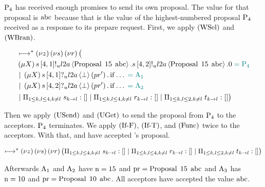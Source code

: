 $\Proposer{4}$ has received enough promises to send its own proposal.
The value for that proposal is $\ABC$ because that is the value of the highest-numbered proposal $\Proposer{4}$ received as a response to its prepare request.
First, we apply $\RWsel$ and $\RWbran$.

\begin{align*}
&\mapstostar \NuChannels \big (\\
&\Mu{\RecursionVariable} \SendUnreliableP{s}{4}{1}{\LTwoA}{\ProposalC{15}{\ABC}}.
\SendUnreliableP{s}{4}{2}{\LTwoA}{\ProposalC{15}{\ABC}}.\End \comment{= \Proposer{4}}\\
&\Or \Mu{\RecursionVariable} \ReceiveUnreliableP{s}{4}{1}{\LTwoA}{\bot}{pr'}.\If{\dots}\comment{= \Acceptor{1}}\\
&\Or \Mu{\RecursionVariable} \ReceiveUnreliableP{s}{4}{2}{\LTwoA}{\bot}{pr'}.\If{\dots}\comment{= \Acceptor{2}}\\
&\Or \InnerSessionQueues{s}
\Or \InnerSessionQueues{r}
\Or \OuterSessionQueues
\big )
\end{align*}

Then we apply $\RUsend$ and $\RUget$ to send the proposal from $\Proposer{4}$ to the acceptors.
$\Proposer{4}$ terminates.
We apply $\RIfF$, $\RIfT$, and $\RSideEffect$ twice to the acceptors.
With that,  and  have accepted 's proposal.

\[\mapstostar
\NuChannels \big (\InnerSessionQueues{s}
\Or \InnerSessionQueues{r}
\Or \OuterSessionQueues
\big )\]

Afterwards $\Acceptor{1}$ and $\Acceptor{2}$ have $\NumberRegister =  15$ and $\ProposalRegister =  \ProposalC{15}{\ABC}$ and $\Acceptor{3}$ has $\NumberRegister =  10$ and $\ProposalRegister =  \ProposalC{10}{\ABC}$.
All acceptors have accepted the value $\ABC$.
